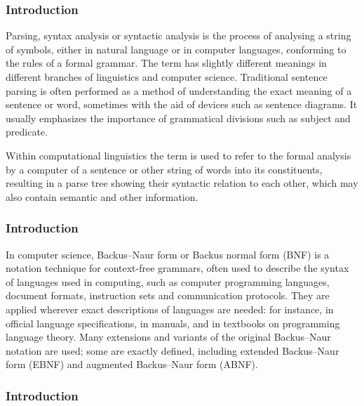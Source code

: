 \documentclass{beamer}
\begin{document}
\begin{frame}
    \frametitle{Introduction}
    \begin{minipage}{\textwidth}
        Parsing, syntax analysis or syntactic analysis is the process of analysing a string of symbols, either in natural language or in computer languages, conforming to the rules of a formal grammar. 
        The term has slightly different meanings in different branches of linguistics and computer science. Traditional sentence parsing is often performed as a method of understanding the exact meaning of a sentence or word, sometimes with the aid of devices such as sentence diagrams. It usually emphasizes the importance of grammatical divisions such as subject and predicate.

        Within computational linguistics the term is used to refer to the formal analysis by a computer of a sentence or other string of words into its constituents, resulting in a parse tree showing their syntactic relation to each other, which may also contain semantic and other information.
    \end{minipage}
\end{frame}

\begin{frame}
    \frametitle{Introduction}
    \begin{minipage}{\textwidth}
        In computer science, Backus–Naur form or Backus normal form (BNF) is a notation technique for context-free grammars, often used to describe the syntax of languages used in computing, such as computer programming languages, document formats, instruction sets and communication protocols. They are applied wherever exact descriptions of languages are needed: for instance, in official language specifications, in manuals, and in textbooks on programming language theory.
        Many extensions and variants of the original Backus–Naur notation are used; some are exactly defined, including extended Backus–Naur form (EBNF) and augmented Backus–Naur form (ABNF).
    \end{minipage}
\end{frame}

\begin{frame}
    \frametitle{Introduction}
    \begin{minipage}{\textwidth}
    \end{minipage}
\end{frame}  
\end{document}
